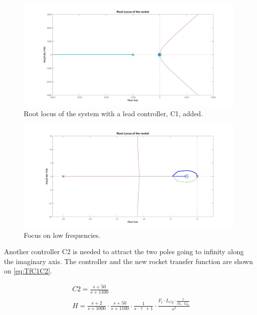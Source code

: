 \begin{figure}[htbp]
\centering
\includegraphics[width=\textwidth]{figures/Rocket/design/tf_with_controllerC1}
\caption{Root locus of the system with a lead controller, C1, added.}
\label{fig:SystemC1}
\end{figure}

\begin{figure}[htbp]
\centering
\includegraphics[width=\textwidth]{figures/Rocket/design/tf_with_controllerC1_zoom}
\caption{Focus on low frequencies.}
\label{fig:SystemC1zoom}
\end{figure}

Another controller C2 is needed to attract the two poles going to infinity along the imaginary axis. The controller and the new rocket transfer function are shown on \autoref{eq:TfC1C2}.

\begin{subequations}
	\begin{flalign}
		& C2 = \frac{s + 50}{s + 1100}	\\
		& H = \frac{s + 2}{s + 1000} \cdot \frac{s + 50}{s + 1100} \cdot \frac{1}{s \cdot \uptau + 1} \cdot \frac{F_t \cdot L_{Cg} \cdot \frac{1}{M_r \cdot L_{Es}^2}}{s^2}
		\label{eq:TfC1C2}
	\end{flalign}
\end{subequations}

